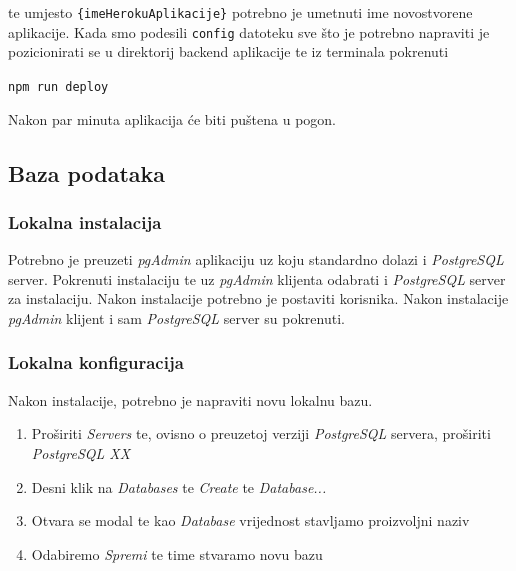 								te umjesto \texttt{\{imeHerokuAplikacije\}} potrebno je umetnuti ime novostvorene aplikacije. Kada smo podesili \texttt{config} datoteku sve što je potrebno napraviti je pozicionirati se u direktorij backend aplikacije te iz terminala pokrenuti 

								\begin{center}
										\texttt{npm run deploy}
								\end{center}
								
								Nakon par minuta aplikacija će biti puštena u pogon.
						
						\pagebreak
		    
				\subsection{Baza podataka}
			
						\subsubsection*{Lokalna instalacija}
						
								Potrebno je preuzeti \textit{pgAdmin} aplikaciju uz koju standardno dolazi i \textit{PostgreSQL} server. Pokrenuti instalaciju te uz \textit{pgAdmin} klijenta odabrati i \textit{PostgreSQL} server za instalaciju. Nakon instalacije potrebno je postaviti korisnika. Nakon instalacije \textit{pgAdmin} klijent i sam \textit{PostgreSQL} server su pokrenuti.
								
						\subsubsection*{Lokalna konfiguracija}
								
								Nakon instalacije, potrebno je napraviti novu lokalnu bazu.
								
								\begin{enumerate}
										\item Proširiti \textit{Servers} te, ovisno o preuzetoj verziji \textit{PostgreSQL} servera, proširiti  \textit{PostgreSQL XX}
										\item Desni klik na \textit{Databases} te \textit{Create} te \textit{Database...}
										\item Otvara se modal te kao \textit{Database} vrijednost stavljamo proizvoljni naziv
										\item Odabiremo \textit{Spremi} te time stvaramo novu bazu
								\end{enumerate}
								
